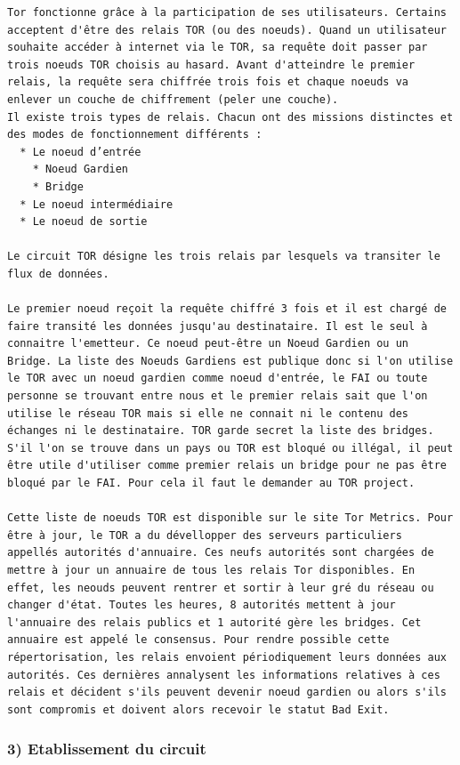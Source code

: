 \documentclass[]{article}
\begin{document}
\begin{verbatim}
Tor fonctionne grâce à la participation de ses utilisateurs. Certains acceptent d'être des relais TOR (ou des noeuds). Quand un utilisateur souhaite accéder à internet via le TOR, sa requête doit passer par trois noeuds TOR choisis au hasard. Avant d'atteindre le premier relais, la requête sera chiffrée trois fois et chaque noeuds va enlever un couche de chiffrement (peler une couche).
Il existe trois types de relais. Chacun ont des missions distinctes et des modes de fonctionnement différents :
  * Le noeud d’entrée
    * Noeud Gardien
    * Bridge
  * Le noeud intermédiaire
  * Le noeud de sortie

Le circuit TOR désigne les trois relais par lesquels va transiter le flux de données.

Le premier noeud reçoit la requête chiffré 3 fois et il est chargé de faire transité les données jusqu'au destinataire. Il est le seul à connaitre l'emetteur. Ce noeud peut-être un Noeud Gardien ou un Bridge. La liste des Noeuds Gardiens est publique donc si l'on utilise le TOR avec un noeud gardien comme noeud d'entrée, le FAI ou toute personne se trouvant entre nous et le premier relais sait que l'on utilise le réseau TOR mais si elle ne connait ni le contenu des échanges ni le destinataire. TOR garde secret la liste des bridges. S'il l'on se trouve dans un pays ou TOR est bloqué ou illégal, il peut être utile d'utiliser comme premier relais un bridge pour ne pas être bloqué par le FAI. Pour cela il faut le demander au TOR project.

Cette liste de noeuds TOR est disponible sur le site Tor Metrics. Pour être à jour, le TOR a du dévellopper des serveurs particuliers appellés autorités d'annuaire. Ces neufs autorités sont chargées de mettre à jour un annuaire de tous les relais Tor disponibles. En effet, les neouds peuvent rentrer et sortir à leur gré du réseau ou changer d'état. Toutes les heures, 8 autorités mettent à jour l'annuaire des relais publics et 1 autorité gère les bridges. Cet annuaire est appelé le consensus. Pour rendre possible cette répertorisation, les relais envoient périodiquement leurs données aux autorités. Ces dernières annalysent les informations relatives à ces relais et décident s'ils peuvent devenir noeud gardien ou alors s'ils sont compromis et doivent alors recevoir le statut Bad Exit.
\end{verbatim}

\subsubsection{3) Etablissement du
circuit}\label{etablissement-du-circuit}
\end{document}
